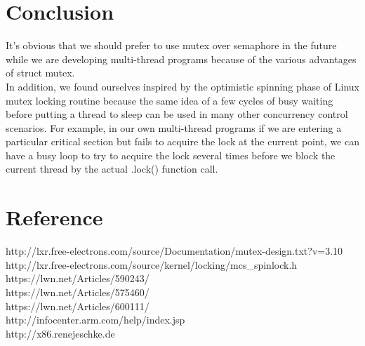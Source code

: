 \documentclass[10pt]{sigplanconf}
\begin{document}
\vspace{50pt}

\section{Conclusion}
It's obvious that we should prefer to use mutex over semaphore in the future while we are developing multi-thread programs because of the various advantages of struct mutex. \\
In addition, we found ourselves inspired by the optimistic spinning phase of Linux mutex locking routine because the same idea of a few cycles of busy waiting before putting a thread to sleep can be used in many other concurrency control scenarios. For example, in our own multi-thread programs if we are entering a particular critical section but fails to acquire the lock at the current point, we can have a busy loop to try to acquire the lock several times before we block the current thread by the actual .lock() function call. 

\vspace{50pt}


\section{Reference}
http://lxr.free-electrons.com/source/Documentation/mutex-design.txt?v=3.10\\

\noindent http://lxr.free-electrons.com/source/kernel/locking/mcs\_spinlock.h\\

\noindent https://lwn.net/Articles/590243/\\

\noindent https://lwn.net/Articles/575460/\\

\noindent https://lwn.net/Articles/600111/\\

\noindent http://infocenter.arm.com/help/index.jsp\\

\noindent http://x86.renejeschke.de
\end{document}
